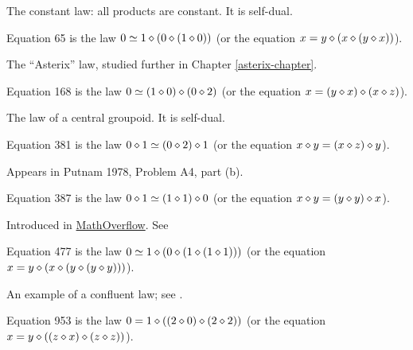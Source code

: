 The constant law: all products are constant. It is self-dual.

\begin{definition}[Equation 65]\label{eq65}\leanok{}  Equation 65 is the law $0 \simeq 1 \diamond (0 \diamond (1 \diamond 0))$ (or the equation $x = y \diamond (x \diamond (y \diamond x))$).
\end{definition}

The ``Asterix'' law, studied further in Chapter \ref{asterix-chapter}.

\begin{definition}[Equation 168]\label{eq168}\leanok{}  Equation 168 is the law $0  \simeq  (1 \diamond 0) \diamond (0 \diamond 2)$ (or the equation $x = (y \diamond x) \diamond (x \diamond z)$).
\end{definition}

The law of a central groupoid. It is self-dual.

\begin{definition}[Equation 381]\label{eq381}\leanok{}  Equation 381 is the law $0 \diamond 1  \simeq  (0 \diamond 2) \diamond 1$ (or the equation $x \diamond y = (x \diamond z) \diamond y$).
\end{definition}

Appears in Putnam 1978, Problem A4, part (b).

\begin{definition}[Equation 387]\label{eq387}\leanok{}  Equation 387 is the law $0 \diamond 1  \simeq  (1 \diamond 1) \diamond 0$ (or the equation $x \diamond y = (y \diamond y) \diamond x$).
\end{definition}

Introduced in \href{https://mathoverflow.net/a/450905/766}{MathOverflow}. See 

\begin{definition}[Equation 477]\label{eq477}\leanok{}  Equation 477 is the law $0 \simeq 1 \diamond (0 \diamond (1 \diamond (1 \diamond 1)))$ (or the equation $x = y \diamond (x \diamond (y \diamond (y \diamond y)))$).
\end{definition}

An example of a confluent law; see .

\begin{definition}[Equation 953]\label{eq953}\leanok{}  Equation 953 is the law $0 = 1 \diamond ((2 \diamond 0) \diamond (2 \diamond 2))$ (or the equation $x = y \diamond ((z \diamond x) \diamond (z \diamond z))$).
\end{definition}

